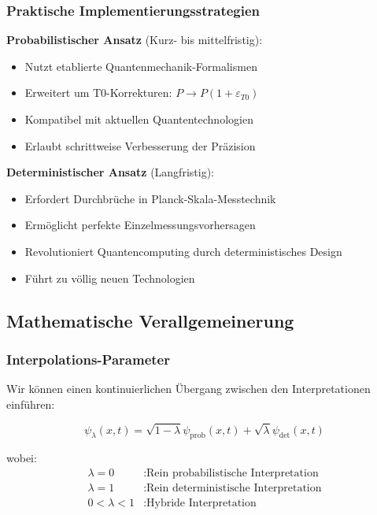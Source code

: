 \documentclass[12pt,a4paper]{article}
\theoremstyle{definition}
\theoremstyle{remark}
\begin{document}
\subsubsection{Praktische Implementierungsstrategien}

\textbf{Probabilistischer Ansatz} (Kurz- bis mittelfristig):
\begin{itemize}
	\item Nutzt etablierte Quantenmechanik-Formalismen
	\item Erweitert um T0-Korrekturen: $P \rightarrow P(1 + \varepsilon_{T0})$
	\item Kompatibel mit aktuellen Quantentechnologien
	\item Erlaubt schrittweise Verbesserung der Präzision
\end{itemize}

\textbf{Deterministischer Ansatz} (Langfristig):
\begin{itemize}
	\item Erfordert Durchbrüche in Planck-Skala-Messtechnik
	\item Ermöglicht perfekte Einzelmessungsvorhersagen
	\item Revolutioniert Quantencomputing durch deterministisches Design
	\item Führt zu völlig neuen Technologien
\end{itemize}

\subsection{Mathematische Verallgemeinerung}

\subsubsection{Interpolations-Parameter}

Wir können einen kontinuierlichen Übergang zwischen den Interpretationen einführen:

\begin{equation}
	\boxed{\psi_\lambda(x,t) = \sqrt{1-\lambda} \psi_{\text{prob}}(x,t) + \sqrt{\lambda} \psi_{\text{det}}(x,t)}
	\label{eq:interpolation_parameter}
\end{equation}

wobei:
\begin{align}
	\lambda = 0 &: \text{Rein probabilistische Interpretation} \\
	\lambda = 1 &: \text{Rein deterministische Interpretation} \\
	0 < \lambda < 1 &: \text{Hybride Interpretation}
\end{align}
\end{document}
